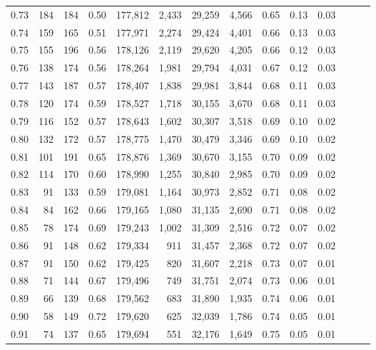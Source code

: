 \begin{tabular}{rrrrrrrrrrrrrr}
0.73 &     184 &  184 &  0.50 &  177,812 &    2,433 &  29,259 &   4,566 &  0.65 &  0.13 &      0.03 \\
0.74 &     159 &  165 &  0.51 &  177,971 &    2,274 &  29,424 &   4,401 &  0.66 &  0.13 &      0.03 \\
0.75 &     155 &  196 &  0.56 &  178,126 &    2,119 &  29,620 &   4,205 &  0.66 &  0.12 &      0.03 \\
0.76 &     138 &  174 &  0.56 &  178,264 &    1,981 &  29,794 &   4,031 &  0.67 &  0.12 &      0.03 \\
0.77 &     143 &  187 &  0.57 &  178,407 &    1,838 &  29,981 &   3,844 &  0.68 &  0.11 &      0.03 \\
0.78 &     120 &  174 &  0.59 &  178,527 &    1,718 &  30,155 &   3,670 &  0.68 &  0.11 &      0.03 \\
0.79 &     116 &  152 &  0.57 &  178,643 &    1,602 &  30,307 &   3,518 &  0.69 &  0.10 &      0.02 \\
0.80 &     132 &  172 &  0.57 &  178,775 &    1,470 &  30,479 &   3,346 &  0.69 &  0.10 &      0.02 \\
0.81 &     101 &  191 &  0.65 &  178,876 &    1,369 &  30,670 &   3,155 &  0.70 &  0.09 &      0.02 \\
0.82 &     114 &  170 &  0.60 &  178,990 &    1,255 &  30,840 &   2,985 &  0.70 &  0.09 &      0.02 \\
0.83 &      91 &  133 &  0.59 &  179,081 &    1,164 &  30,973 &   2,852 &  0.71 &  0.08 &      0.02 \\
0.84 &      84 &  162 &  0.66 &  179,165 &    1,080 &  31,135 &   2,690 &  0.71 &  0.08 &      0.02 \\
0.85 &      78 &  174 &  0.69 &  179,243 &    1,002 &  31,309 &   2,516 &  0.72 &  0.07 &      0.02 \\
0.86 &      91 &  148 &  0.62 &  179,334 &      911 &  31,457 &   2,368 &  0.72 &  0.07 &      0.02 \\
0.87 &      91 &  150 &  0.62 &  179,425 &      820 &  31,607 &   2,218 &  0.73 &  0.07 &      0.01 \\
0.88 &      71 &  144 &  0.67 &  179,496 &      749 &  31,751 &   2,074 &  0.73 &  0.06 &      0.01 \\
0.89 &      66 &  139 &  0.68 &  179,562 &      683 &  31,890 &   1,935 &  0.74 &  0.06 &      0.01 \\
0.90 &      58 &  149 &  0.72 &  179,620 &      625 &  32,039 &   1,786 &  0.74 &  0.05 &      0.01 \\
0.91 &      74 &  137 &  0.65 &  179,694 &      551 &  32,176 &   1,649 &  0.75 &  0.05 &      0.01 \\

\end{tabular}
